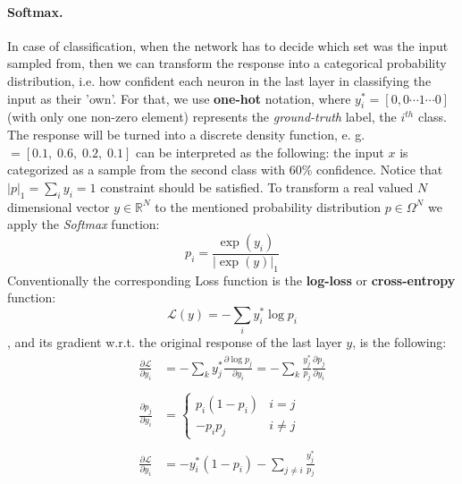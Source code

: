 \paragraph{Softmax.} In case of classification, 
when the network has to decide which set was the input sampled from, 
then we can transform the response into a categorical probability distribution, 
i.e. how confident each neuron in the last layer in classifying the input as their 'own'.
For that, we use \textbf{one-hot} notation, where $y^*_i = \left[ 0,0 \cdots 1 \cdots 0\right]$ (with only one non-zero element) represents the \emph{ground-truth} label, the $i^{th}$ class.
The response will be turned into a discrete density function, e. g. $  = [0.1, \; 0.6, \; 0.2, \; 0.1]$ can be interpreted as the following:
the input $x$ is categorized as a sample from the second class with 60\% confidence. Notice that $|p|_1=\sum_i y_i=1$ constraint should be satisfied.
To transform a real valued $N$ dimensional vector $y \in \mathbb{R}^N$ to the mentioned probability distribution $p\in \Omega^N$ we apply the \emph{Softmax} function:
\begin{equation}
p_i = \frac{\exp(y_i)}{|\exp(y)|_1}
\end{equation}
Conventionally the corresponding Loss function is the \textbf{log-loss} or \textbf{cross-entropy} function:
\begin{equation}
\mathcal{L}(y)=-\sum_i y^*_i \log p_i
\end{equation},
and its gradient w.r.t. the original response of the last layer $y$, is the following:
\begin{equation}
\begin{split}
\frac{\partial \mathcal{L}}{\partial y_i} &= 
-\sum_k y^*_j \frac{\partial \log p_j}{\partial y_i} = 
-\sum_k \frac{y^*_j}{p_j}\frac{\partial p_j}{\partial y_i} \\ \\
\frac{\partial p_j}{\partial y_i} &= 
\begin{cases}
    p_i(1-p_i) & i=j \\
    -p_i p_j & i \neq j
\end{cases} \\ \\
\frac{\partial \mathcal{L}}{\partial y_i} &= 
-y^*_i\left(1-p_i\right) - \sum_{j \neq i} \frac{y^*_j}{p_j}
\end{split}
\end{equation}